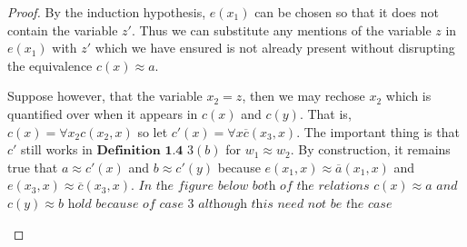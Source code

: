\documentclass{article}
\theoremstyle{problemstyle}
\theoremstyle{lemmastyle}
\theoremstyle{theoremstyle}
\begin{document}
\begin{proof}
By the induction hypothesis, $e(x_1)$ can be chosen so that it does not contain the variable $z'$. Thus we can substitute any mentions of the variable $z$ in $e(x_1)$ with $z'$ which we have ensured is not already present without disrupting the equivalence $c(x) \approx a$.  

Suppose however, that the variable $x_2 = z$, then we may rechose $x_2$ which is quantified over when it appears in $c(x)$ and $c(y)$. That is, $c(x) = \forall x_2c(x_2,x)$ so let $c'(x) = \forall x\overline{c}(x_3,x)$. The important thing is that $c'$ still works in $\textbf{Definition 1.4}$ $3 (b)$ for $w_1 \approx w_2$. By construction, it remains true that $a \approx c'(x)$ and $b \approx c'(y)$ because $e(x_1, x) \approx \overline{a}(x_1, x)$ and $e(x_3,x) \approx \overline{c}(x_3,x)$. $\textit{In the figure below both of the relations}$ $c(x) \approx a$ $\textit{and}$ $c(y) \approx b$ $\textit{hold because of case 3 although this need not be the case}$

\begin{flushleft}
\end{flushleft}
\end{proof}
\end{document}

